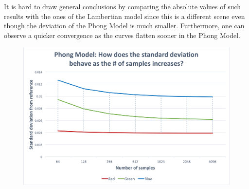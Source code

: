 \documentclass{article}
\begin{document}
It is hard to draw general conclusions by comparing the absolute values of such results with the ones of the Lambertian model since this is a different scene even though the deviation of the Phong Model is much smaller. Furthermore, one can observe a quicker convergence as the curves flatten sooner in the Phong Model.
\begin{figure}[h]
\centering
\includegraphics[width=\textwidth]{assets/phong_stdev}
\label{fig:phong_stdev}
\end{figure}
\end{document}
